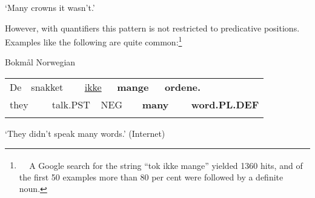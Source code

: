 \begin{styleTranslation}
‘Many crowns it wasn’t.’

\end{styleTranslation}

\begin{styleBodyTextFirst}
However, with quantifiers this pattern is not restricted to predicative positions. Examples like the following are quite common:\footnote{\textsuperscript{\ \ } A Google search for the string “tok ikke mange” yielded 1360 hits, and of the first 50 examples more than 80 per cent were followed by a definite noun.}

\end{styleBodyTextFirst}

\begin{listWWNumileveli}
\item {}

\begin{styleExample}
Bokmål Norwegian 

\end{styleExample}

\end{listWWNumileveli}

\begin{listWWNumxlileveli}
\item {}

\end{listWWNumxlileveli}

\begin{tabular}{llllllllll}
\lsptoprule
De & \multicolumn{2}{l}{snakket

} & \multicolumn{2}{l}{\hyperlink{here}{ikke}

} & \multicolumn{2}{l}{{\bfseries mange}

} & \multicolumn{2}{l}{{\bfseries ordene.}

} & \\
\multicolumn{2}{l}{they

} & \multicolumn{2}{l}{talk.PST

} & \multicolumn{2}{l}{NEG

} & \multicolumn{2}{l}{{\bfseries many}

} & \multicolumn{2}{l}{{\bfseries word.PL.DEF}

}\\
\lspbottomrule
\end{tabular}

\begin{styleTranslation}
‘They didn’t speak many words.’ (Internet)

\end{styleTranslation}

